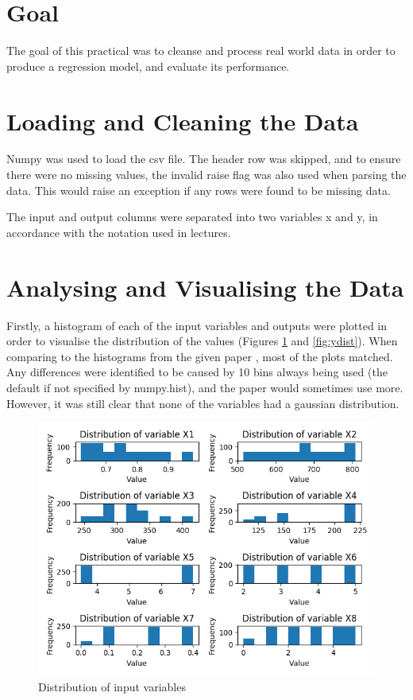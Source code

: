 \documentclass[12pt]{article}
\begin{document}
\part*{Goal}

The goal of this practical was to cleanse and process real world data in order to produce a regression model, and evaluate its performance.

\part{Loading and Cleaning the Data}

Numpy was used to load the csv file. The header row was skipped, and to ensure there were no missing values, the invalid raise flag was also used when parsing the data. This would raise an exception if any rows were found to be missing data. 

The input and output columns were separated into two variables x and y, in accordance with the notation used in lectures.

\part{Analysing and Visualising the Data}

Firstly, a histogram of each of the input variables and outputs were plotted in order to visualise the distribution of the values (Figures \ref{fig:xdist} and \ref{fig:ydist}). When comparing to the histograms from the given paper \cite{tsanas_xifara_2012}, most of the plots matched. Any differences were identified to be caused by 10 bins always being used (the default if not specified by numpy.hist), and the paper would sometimes use more. However, it was still clear that none of the variables had a gaussian distribution.

\begin{figure}[!ht]
\centering
\includegraphics[width=0.8 \linewidth]{images/XDist}
\caption{Distribution of input variables}
\label{fig:xdist}
\end{figure}
\end{document}

